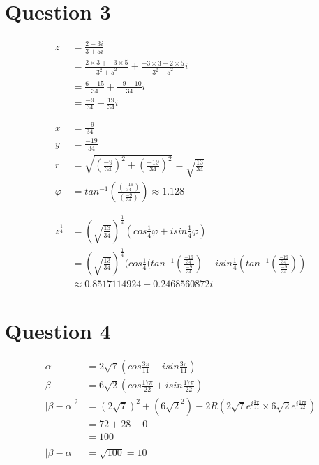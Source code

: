 \documentclass{article}
\begin{document}
\section{Question 3}
\begin{align*}
z &= \frac{2-3i}{3+5i} \\ 
&= \frac{2\times3 + -3\times5}{3^2 + 5^2} + \frac{-3\times3 - 2\times5}{3^2+5^2}i \\ 
&= \frac{6-15}{34} + \frac{-9-10}{34}i \\ 
&= \frac{-9}{34} - \frac{19}{34}i
\\  \\ \\ 
x &= \frac{-9}{34}  \\ 
y &= \frac{-19}{34} \\ 
r &= \sqrt{(\frac{-9}{34})^2 + (\frac{-19}{34})^2} = \sqrt{\frac{13}{34}} \\ 
\varphi &= tan^{-1}(\frac{(\frac{-19}{34})}{(\frac{-9}{34})}) \approx 1.128 \\ %
\\ \\ 
z^{\frac{1}{4}} &= (\sqrt{\frac{13}{34}})^{\frac{1}{4}}(cos\frac{1}{4}\varphi + isin\frac{1}{4}\varphi)
 \\ &= (\sqrt{\frac{13}{34}})^{\frac{1}{4}}(cos\frac{1}{4}(tan^{-1}(\frac{\frac{-19}{34}}{\frac{-9}{34}}) + isin\frac{1}{4}(tan^{-1}(\frac{\frac{-19}{34}}{\frac{-9}{34}})) 
 \\ &\approx 0.8517114924 + 0.2468560872i 
\end{align*}



\section{Question 4}
\begin{align*}
    \alpha &= 2\sqrt{7}(cos\frac{3\pi}{11} + isin\frac{3\pi}{11}) \\ 
    \beta &= 6\sqrt{2}(cos\frac{17\pi}{22} + isin\frac{17\pi}{22}) \\ 
    |\beta - \alpha|^2 &= (2\sqrt{7})^2 + (6\sqrt{2}^2) - 2R(2\sqrt{7}e^{i\frac{3\pi}{11}} \times 6\sqrt{2}e^{i\frac{17\pi}{22}}) \\ 
    &= 72 + 28 - 0 \\
    &= 100 
    \\ \\ 
    |\beta - \alpha| &= \sqrt{100} = 10
\end{align*}
\end{document}
